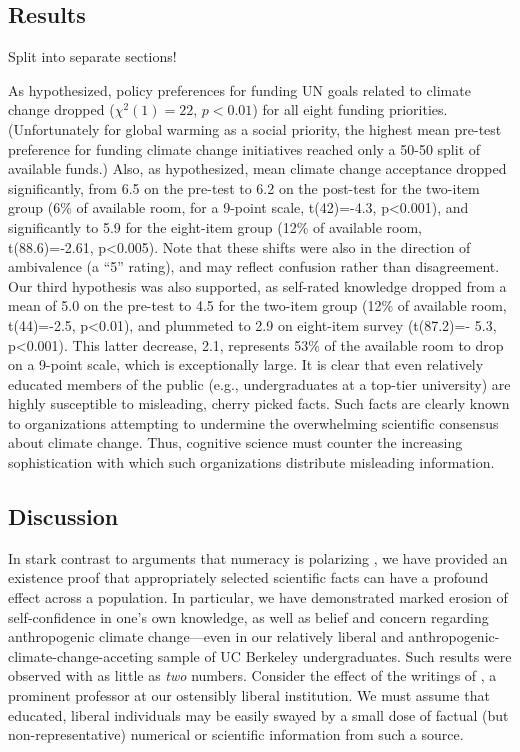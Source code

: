 
\subsection{Results}

Split into separate sections! 

As hypothesized, policy preferences for funding UN goals
related to climate change dropped ($\chi^2(1)=22$, $p<0.01$) for all eight funding
priorities. (Unfortunately for global warming as a social priority, the highest
mean pre-test preference for funding climate change initiatives reached only a
50-50 split of available funds.) Also, as hypothesized, mean climate change
acceptance dropped significantly, from 6.5 on the pre-test to 6.2 on the
post-test for the two-item group (6\% of available room, for a 9-point scale,
t(42)=-4.3, p<0.001), and significantly to 5.9 for the eight-item group (12\% of
available room, t(88.6)=‑2.61, p<0.005). Note that these shifts were also in the
direction of ambivalence (a ``5'' rating), and may reflect confusion rather than
disagreement. Our third hypothesis was also supported, as self-rated knowledge
dropped from a mean of 5.0 on the pre-test to 4.5 for the two-item group (12\% of
available room, t(44)=-2.5, p<0.01), and plummeted to 2.9 on eight-item survey
(t(87.2)=- 5.3, p<0.001). This latter decrease, 2.1, represents 53\% of the
available room to drop on a 9-point scale, which is exceptionally large.  It is
clear that even relatively educated members of the public (e.g., undergraduates
at a top-tier university) are highly susceptible to misleading, cherry picked
facts. Such facts are clearly known to organizations attempting to undermine the
overwhelming scientific consensus about climate change. Thus, cognitive science
must counter the increasing sophistication with which such organizations
distribute misleading information.

\subsection{Discussion}

In stark contrast to arguments that numeracy is polarizing \parencite{kahan}, we
have provided an existence proof that appropriately selected scientific facts
can have a profound effect across a population. In particular, we have
demonstrated marked erosion of self-confidence in one's own knowledge, as well
as belief and concern regarding anthropogenic climate change---even in our
relatively liberal and anthropogenic-climate-change-acceting sample of UC
Berkeley undergraduates.  Such results were observed with as little as
\emph{two} numbers.
Consider the effect of the writings of \textcite{mueller}, a prominent professor
at our ostensibly liberal institution. We must assume that educated, liberal
individuals may be easily swayed by a small dose of factual (but
non-representative) numerical or scientific information from such a source.

